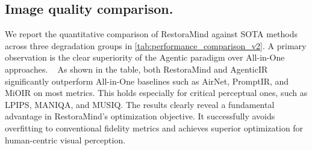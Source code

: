 \noindent\subsection{Image quality comparison.}
We report the quantitative comparison of RestoraMind against SOTA methods across three degradation groups in \cref{tab:performance_comparison_v2}. A primary observation is the clear superiority of the Agentic paradigm over All-in-One approaches. ~\cite{li2022all,potlapalli2023promptir,kong2024towards,luo2023controlling,conde2024instructir,jiang2024autodir,zhu2024intelligent} As shown in the table, both RestoraMind and AgenticIR significantly outperform All-in-One baselines such as AirNet, PromptIR, and MiOIR on most metrics. This holds especially for critical perceptual ones, such as LPIPS, MANIQA, and MUSIQ. The results clearly reveal a fundamental advantage in RestoraMind's optimization objective. It successfully avoids overfitting to conventional fidelity metrics and achieves superior optimization for human-centric visual perception.


